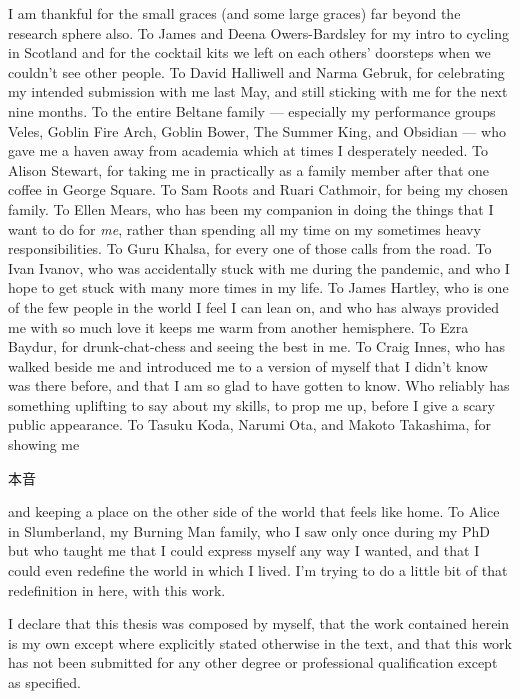 \documentclass[phd,ilcc,oneside,leftchapter,parskip]{infthesis}
\begin{document}
\begin{preliminary}
\begin{acknowledgements}
I am thankful for the small graces (and some large graces) far beyond the research sphere also. To James and Deena Owers-Bardsley for my intro to cycling in Scotland and for the cocktail kits we left on each others' doorsteps when we couldn't see other people. To David Halliwell and Narma Gebruk, for celebrating my intended submission with me last May, and still sticking with me for the next nine months. To the entire Beltane family --- especially my performance groups Veles, Goblin Fire Arch, Goblin Bower, The Summer King, and Obsidian --- who gave me a haven away from academia which at times I desperately needed. To Alison Stewart, for taking me in practically as a family member after that one coffee in George Square. To Sam Roots and Ruari Cathmoir, for being my chosen family. To Ellen Mears, who has been my companion in doing the things that I want to do for \textit{me}, rather than spending all my time on my sometimes heavy responsibilities. To Guru Khalsa, for every one of those calls from the road. To Ivan Ivanov, who was accidentally stuck with me during the pandemic, and who I hope to get stuck with many more times in my life. To James Hartley, who is one of the few people in the world I feel I can lean on, and who has always provided me with so much love it keeps me warm from another hemisphere. To Ezra Baydur, for drunk-chat-chess and seeing the best in me. To Craig Innes, who has walked beside me and introduced me to a version of myself that I didn't know was there before, and that I am so glad to have gotten to know.  Who reliably has something uplifting to say about my skills, to prop me up, before I give a scary public appearance. To Tasuku Koda, Narumi Ota, and Makoto Takashima, for showing me \begin{CJK*}{UTF8}{ipxm} 本音 \end{CJK*} and keeping a place on the other side of the world that feels like home. To Alice in Slumberland, my Burning Man family, who I saw only once during my PhD but who taught me that I could express myself any way I wanted, and that I could even redefine the world in which I lived. I'm trying to do a little bit of that redefinition in here, with this work. 

\end{acknowledgements}


\begin{declaration}
   I declare that this thesis was composed by myself,
   that the work contained herein is my own 
   except where explicitly stated otherwise in the text,
   and that this work has not been submitted for any other degree or
   professional qualification except as specified.


\end{declaration}
\end{preliminary}
\end{document}
